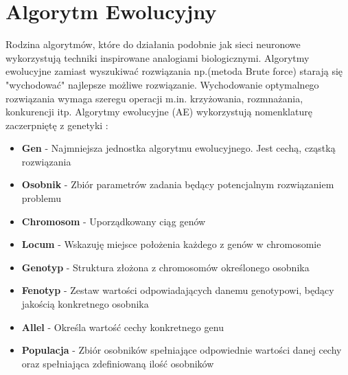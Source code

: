 \documentclass[eng, pl, oneside, openright, final, openbib]{mgr}\DeclareUnicodeCharacter{0301}{\'{e}}
\begin{document}
\section{Algorytm Ewolucyjny}
Rodzina algorytmów, które do działania  podobnie jak sieci neuronowe wykorzystują techniki inspirowane analogiami biologicznymi. Algorytmy ewolucyjne zamiast wyszukiwać rozwiązania np.(metoda Brute force) starają się "wychodować" najlepsze możliwe rozwiązanie. Wychodowanie optymalnego rozwiązania wymaga szeregu operacji m.in. krzyżowania, rozmnażania, konkurencji itp. Algorytmy ewolucyjne (AE) wykorzystują nomenklaturę zaczerpniętę z genetyki :
\newline
\begin{itemize}
\item \textbf{Gen} - Najmniejsza jednostka algorytmu ewolucyjnego. Jest cechą, cząstką rozwiązania
\item \textbf{Osobnik} - Zbiór parametrów zadania będący potencjalnym rozwiązaniem problemu
\item \textbf{Chromosom} - Uporządkowany ciąg genów
\item \textbf{Locum} - Wskazuję miejsce położenia każdego z genów w chromosomie
\item \textbf{Genotyp} - Struktura złożona z chromosomów określonego osobnika 
\item \textbf{Fenotyp} - Zestaw wartości odpowiadających danemu genotypowi, będący jakością konkretnego osobnika
\item \textbf{Allel} - Określa wartość cechy konkretnego genu
\item \textbf{Populacja} - Zbiór osobników spełniające odpowiednie wartości danej cechy oraz spełniająca zdefiniowaną ilość osobników 
\end{itemize}
\end{document}
